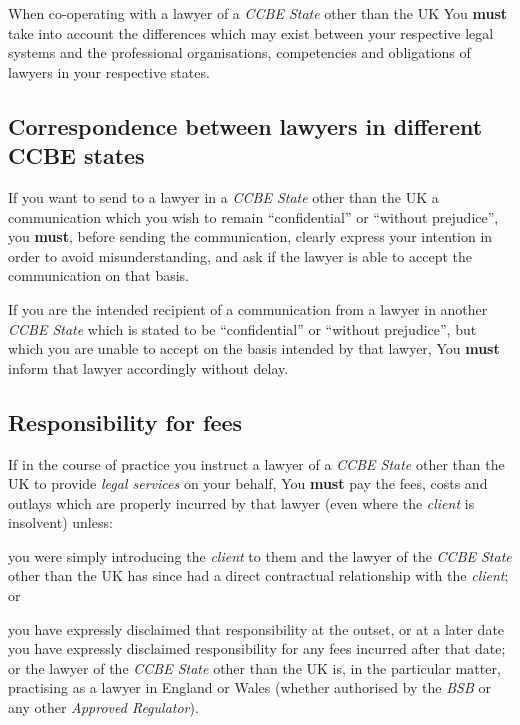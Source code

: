 
When co-operating with a lawyer of a \emph{CCBE State} other than the UK
You \textcolor{myred}{\textbf{must}} take into account the differences which may exist between your
respective legal systems and the professional organisations,
competencies and obligations of lawyers in your respective states.

\subsection{Correspondence between lawyers in different CCBE states}


If you want to send to a lawyer in a \emph{CCBE State} other than the UK
a communication which you wish to remain ``confidential'' or ``without
prejudice'', you \textcolor{myred}{\textbf{must}}, before sending the communication, clearly express
your intention in order to avoid misunderstanding, and ask if the lawyer
is able to accept the communication on that basis.


If you are the intended recipient of a communication from a lawyer in
another \emph{CCBE State} which is stated to be ``confidential'' or
``without prejudice'', but which you are unable to accept on the basis
intended by that lawyer, You \textcolor{myred}{\textbf{must}} inform that lawyer accordingly without
delay.

\subsection{Responsibility for fees}


If in the course of practice you instruct a lawyer of a \emph{CCBE
State} other than the UK to provide \emph{legal services} on your
behalf, You \textcolor{myred}{\textbf{must}} pay the fees, costs and outlays which are properly
incurred by that lawyer (even where the \emph{client} is insolvent)
unless:
\begin{numlist}\item you were simply introducing the \emph{client} to them and the lawyer
of the \emph{CCBE State} other than the UK has since had a direct
contractual relationship with the \emph{client}; or
\item you have expressly disclaimed that responsibility at the outset, or
at a later date you have expressly disclaimed responsibility for any
fees incurred after that date; or the lawyer of the \emph{CCBE State}
other than the UK is, in the particular matter, practising as a lawyer
in England or Wales (whether authorised by the \emph{BSB} or any other
\emph{Approved Regulator}).\end{numlist}

